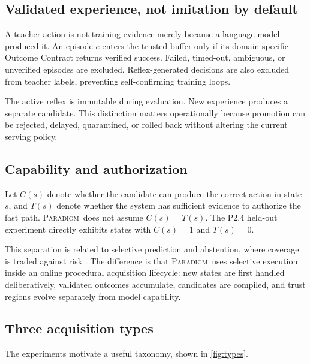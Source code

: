 \documentclass[10pt]{article}
\newcommand{\paradigm}{\textsc{Paradigm}}
\begin{document}
\subsection{Validated experience, not imitation by default}

A teacher action is not training evidence merely because a language model produced it. An episode $e$ enters the trusted buffer only if its domain-specific Outcome Contract returns verified success. Failed, timed-out, ambiguous, or unverified episodes are excluded. Reflex-generated decisions are also excluded from teacher labels, preventing self-confirming training loops.

The active reflex is immutable during evaluation. New experience produces a separate candidate. This distinction matters operationally because promotion can be rejected, delayed, quarantined, or rolled back without altering the current serving policy.

\subsection{Capability and authorization}

Let $C(s)$ denote whether the candidate can produce the correct action in state $s$, and $T(s)$ denote whether the system has sufficient evidence to authorize the fast path. \paradigm\ does not assume $C(s)=T(s)$. The P2.4 held-out experiment directly exhibits states with $C(s)=1$ and $T(s)=0$.

This separation is related to selective prediction and abstention, where coverage is traded against risk \cite{geifman2017selective}. The difference is that \paradigm\ uses selective execution inside an online procedural acquisition lifecycle: new states are first handled deliberatively, validated outcomes accumulate, candidates are compiled, and trust regions evolve separately from model capability.

\subsection{Three acquisition types}

The experiments motivate a useful taxonomy, shown in \cref{fig:types}.
\end{document}
